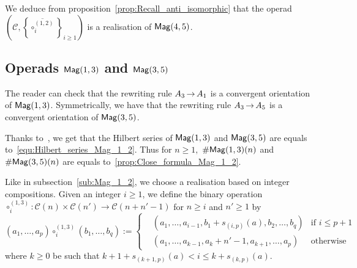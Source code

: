 We deduce from proposition~\ref{prop:Recall_anti_isomorphic} that the
 operad $\left(\mathcal{C},
 \left\{\overline{\circ_i^{(1,2)}}\right\}_{i \geq 1}\right)$
is a realisation of $\mathsf{Mag}(4,5)$.

\subsection{Operads \texorpdfstring{$\mathsf{Mag}(1,3)$}{Mag(1,3)} and
\texorpdfstring{$\mathsf{Mag}(3,5)$}{Mag(3,5)}}
The reader can check that the rewriting rule $A_3 \operatorname{\to} A_1$ is a
convergent orientation of $\mathsf{Mag}(1,3)$. Symmetrically, we have that the
rewriting rule $A_3 \operatorname{\to} A_5$ is a convergent orientation of
$\mathsf{Mag}(3,5)$.

Thanks to~\cite{Gir18}, we get that the Hilbert series of $\mathsf{Mag}(1,3)$
and $\mathsf{Mag}(3,5)$ are equals to~\eqref{equ:Hilbert_series_Mag_1_2}. Thus
for $n \geq 1,$ $\# \mathsf{Mag}(1,3)(n)$ and $\# \mathsf{Mag}(3,5)(n)$ are equals
to~\eqref{prop:Close_formula_Mag_1_2}.

Like in subsection~\ref{sub:Mag_1_2}, we choose a realisation based on
integer compositions. Given an integer $i \geq 1$, we define the
binary operation
$\circ_i^{(1,3)} : \mathcal{C}(n) \times \mathcal{C}(n')\rightarrow
\mathcal{C}(n + n' -1)$ for
$n \geq i$ and $n' \geq 1$ by
\begin{equation}
\left(a_1 , \dots, a_p\right) \circ_i^{(1,3)}
\left(b_1, \dots ,b_{q}\right) := \left\{
 \begin{split}
 & \left(a_1, \dots ,a_{i-1}, b_1 + s_{(i,p)}(a),b_2,\dots,b_{q}\right)
 & \text{if } i \leq p + 1\\
 & \left(a_1, \dots, a_{k-1}, a_{k} + n'-1, a_{k+1},\dots,a_{p}\right)
  & \text{otherwise}
 \end{split}
\right.
\end{equation}
where $k \geq 0$ be such that
$k+1 + s_{(k+1,p)}(a) < i \leq k + s_{(k,p)}(a)$.

